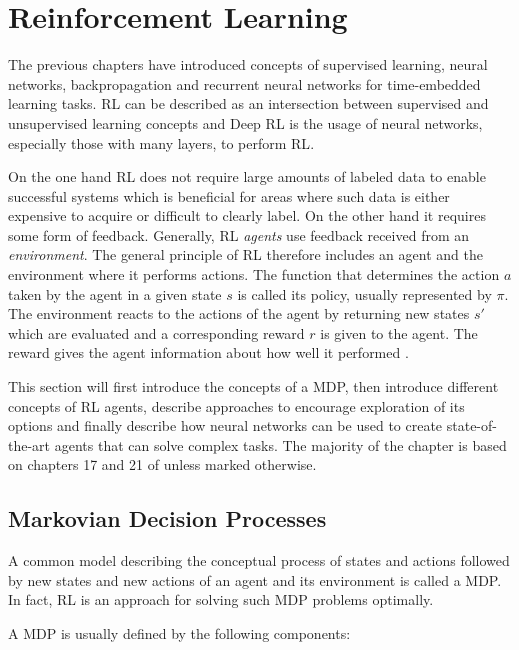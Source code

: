 \section{Reinforcement Learning}

The previous chapters have introduced concepts of supervised learning, neural networks, backpropagation and recurrent
neural networks for time-embedded
learning tasks. \ac{RL} can be described as an intersection between supervised and unsupervised learning concepts and
Deep \ac{RL} is the usage of neural networks, especially those with many layers, to perform \ac{RL}.

On the one hand \ac{RL}  does not require large amounts of labeled data to enable successful systems which is
beneficial for areas where such data is either expensive to acquire or difficult to clearly label. On the other hand it
requires some form of feedback. Generally, \ac{RL} \emph{agents} use feedback received from an \emph{environment}.  The
general principle of \ac{RL} therefore includes an agent and the environment where it performs actions. The function
that determines the action $a$  taken by the agent in a given state $s$ is called its policy, usually represented by
$\pi$.  The environment reacts to the actions of the agent by returning new states $s'$ which are evaluated and a
corresponding reward $r$ is given to the agent. The reward gives the agent information about how well it performed
\citep[p.830f.]{russell2016artificial}.

This section will first introduce the concepts of a \ac{MDP}, then introduce different concepts of \ac{RL} agents,
describe approaches to encourage exploration of its options and finally describe how neural networks can be used to create
state-of-the-art agents that can solve complex tasks. The majority of the chapter is based on
chapters 17 and 21 of \citet[]{russell2016artificial} unless marked otherwise.

\subsection{Markovian Decision Processes}%
\label{ssub:markovian_decision_processes}

A common model describing the conceptual process of states and actions followed by new states and new actions of an
agent and its environment is called a \acf {MDP}. In fact, \ac{RL} is an approach for solving such \ac{MDP} problems
optimally.

A \ac{MDP} is usually defined by the following components:


